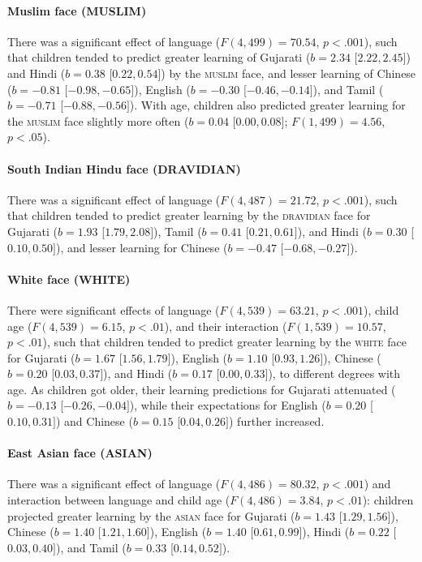 \documentclass{foushee-adapted-preprint}
\begin{document}
\paragraph*{Muslim face {\small{(MUSLIM)}}} 
There was a significant effect of language ($F(4, 499)=70.54$, $p<.001$), such that children tended to predict greater learning of Gujarati ($b=2.34$ [$2.22, 2.45]$) and Hindi ($b=0.38$ [$0.22, 0.54]$) by the \textsc{muslim} face, and lesser learning of Chinese ($b=-0.81$ [$-0.98, -0.65]$), English ($b=-0.30$ [$-0.46, -0.14]$), and Tamil ($b=-0.71$ [$-0.88, -0.56]$). 
With age, children also predicted greater learning for the \textsc{muslim} face slightly more often ($b=0.04$ [$0.00, 0.08]$; $F(1, 499)=4.56$, $p<.05$).

\paragraph*{South Indian Hindu face {\small{(DRAVIDIAN)}}} 
There was a significant effect of language ($F(4, 487)=21.72$, $p<.001$), such that children tended to predict greater learning by the \textsc{dravidian} face for Gujarati ($b=1.93$ [$1.79, 2.08]$), Tamil ($b=0.41$ [$0.21, 0.61]$), and Hindi ($b=0.30$ [$0.10, 0.50]$), and lesser learning for Chinese ($b=-0.47$ [$-0.68, -0.27]$).

\paragraph*{White face {\small{(WHITE)}}} 
There were significant effects of language ($F(4, 539)=63.21$, $p<.001$), child age ($F(4, 539)=6.15$, $p<.01$), and their interaction ($F(1, 539)=10.57$, $p<.01$), such that children tended to predict greater learning by the \textsc{white} face for Gujarati ($b=1.67$ [$1.56, 1.79]$), English ($b=1.10$ [$0.93, 1.26]$), Chinese ($b=0.20$ [$0.03, 0.37]$), and Hindi ($b=0.17$ [$0.00, 0.33]$), to different degrees with age. 
As children got older, their learning predictions for Gujarati attenuated ($b=-0.13$ [$-0.26, -0.04]$), while their expectations for English ($b=0.20$ [$0.10, 0.31]$) and Chinese ($b=0.15$ [$0.04, 0.26]$) further increased. 
\paragraph*{East Asian face {\small{(ASIAN)}}}
There was a significant effect of language ($F(4, 486)=80.32$, $p<.001$) and interaction between language and child age ($F(4, 486)=3.84$, $p<.01$): children projected greater learning by the \textsc{asian} face for Gujarati ($b=1.43$ [$1.29, 1.56]$), Chinese ($b=1.40$ [$1.21, 1.60]$), English ($b=1.40$ [$0.61, 0.99]$), Hindi ($b=0.22$ [$0.03, 0.40]$), and Tamil ($b=0.33$ [$0.14, 0.52]$). 
\end{document}
